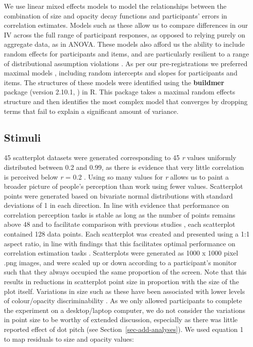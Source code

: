 \documentclass[manuscript, review, anonymous, screen]{acmart}
\begin{document}
We use linear mixed effects models to model the relationships between
the combination of size and opacity decay functions and participants'
errors in correlation estimates. Models such as these allow us to
compare differences in our IV across the full range of participant
responses, as opposed to relying purely on aggregate data, as in ANOVA.
These models also afford us the ability to include random effects for
participants and items, and are particularly resilient to a range of
distributional assumption violations \citep{schielzeth_2020}. As per our
pre-registrations we preferred maximal models \citep{barr_2013},
including random intercepts and slopes for participants and items. The
structures of these models were identified using the \textbf{buildmer}
package (version 2.10.1, \citep{voeten_buildmer}) in R. This package
takes a maximal random effects structure and then identifies the most
complex model that converges by dropping terms that fail to explain a
significant amount of variance.

\hypertarget{sec-scatter-gen}{%
\subsection{Stimuli}\label{sec-scatter-gen}}

45 scatterplot datasets were generated corresponding to 45 \emph{r}
values uniformly distributed between 0.2 and 0.99, as there is evidence
that very little correlation is perceived below \emph{r} = 0.2
\citep{strahan_1978, bobko_1979, cleveland_1982}. Using so many values
for \emph{r} allows us to paint a broader picture of people's perception
than work using fewer values. Scatterplot points were generated based on
bivariate normal distributions with standard deviations of 1 in each
direction. In line with evidence that performance on correlation
perception tasks is stable as long as the number of points remains above
48 \citep{rensink_2014} and to facilitate comparison with previous
studies \citep{strain_2023, strain_2023b}, each scatterplot contained
128 data points. Each scatterplot was created and presented using a 1:1
aspect ratio, in line with findings that this facilitates optimal
performance on correlation estimation tasks \citep{micallef_2017}.
Scatterplots were generated as 1000 x 1000 pixel .png images, and were
scaled up or down according to a participant's monitor such that they
always occupied the same proportion of the screen. Note that this
results in reductions in scatterplot point size in proportion with the
size of the plot itself. Variations in size such as these have been
associated with lower levels of colour/opacity discriminability
\citep{szafir_2018, smart_2019}. As we only allowed participants to
complete the experiment on a desktop/laptop computer, we do not consider
the variations in point size to be worthy of extended discussion,
especially as there was little reported effect of dot pitch (see
Section~\ref{sec-add-analyses}). We used equation 1 to map residuals to
size and opacity values:
\end{document}
